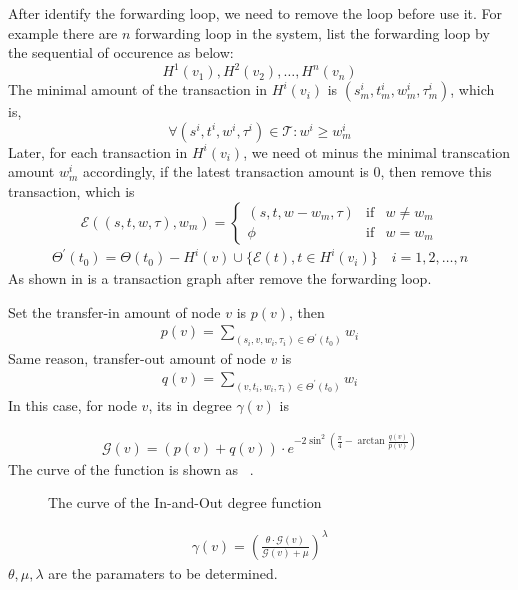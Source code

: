 After identify the forwarding loop, we need to remove the loop before use it. For example there are $n$ forwarding loop in the system, list the forwarding loop by the sequential of occurence as below:
\[
H^1(v_1), H^2(v_2), \dots, H^n(v_n)\]
\noindent The minimal amount of the transaction in $H^i(v_i)$ is $(s^i_m, t^i_m, w^i_m, \tau^i_m)$, which is,
\[
\forall (s^i, t^i, w^i, \tau^i) \in \mathcal{T} : w^i \ge w^i_m
\]
\noindent Later, for each transaction in $H^i(v_i)$, we need ot minus the minimal transcation amount $w^i_m$ accordingly,
if the latest transaction amount is 0, then remove this transaction, which is
\[
\mathcal{E}((s, t, w, \tau), w_m) = \left\{ \begin{array}{rcl}
(s, t, w-w_m, \tau) & \mbox{if} & w \ne w_m \\
\phi & \mbox{if} & w = w_m
\end{array}\right.
\]
\begin{align}
\Theta^{\prime}(t_0)=\Theta(t_0)-H^i(v) \cup \{\mathcal{E}(t), t\in H^i(v_i)\} \quad i = 1, 2,\dots, n
\end{align}
\noindent As shown in  is a transaction graph  after remove the forwarding loop.


Set the transfer-in amount of node $v$ is $p(v)$, then
\begin{align}
p(v) = \sum_{(s_i, v, w_i, \tau_i) \in \Theta^{\prime}(t_0)}{w_i}
\end{align}
\noindent Same reason, transfer-out amount of node $v$ is
\begin{align}
q(v) = \sum_{(v, t_i, w_i, \tau_i) \in \Theta^{\prime}(t_0)}{w_i}
\end{align}
\noindent In this case,
for node $v$, its in degree $\gamma(v)$ is

\begin{align}
\mathcal{G}(v) = (p(v) + q(v)) \cdot e^{-2\sin^2{(\frac{\pi}{4} - \arctan\frac{q(v)}{p(v)})}}
\end{align}
\noindent The curve of the function is shown as ~.
\begin{figure}
  \centering
  
\caption{The curve of the In-and-Out degree function \label{fig-surf}}
\end{figure}

\begin{align}
\gamma(v) = (\frac{\theta\cdot \mathcal{G}(v)}{\mathcal{G}(v) + \mu})^{\lambda}
\end{align}
\noindent $\theta, \mu, \lambda$ are the paramaters to be determined.


